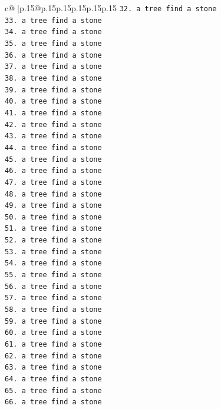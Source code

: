 \documentclass{article}
\begin{document}
{\begin{supertabular}{c@{$\;$}|p{.15\linewidth}@{}p{.15\linewidth}p{.15\linewidth}p{.15\linewidth}p{.15\linewidth}p{.15\linewidth}}
{{{\texttt{32. a tree find a stone} \\
\texttt{33. a tree find a stone} \\
\texttt{34. a tree find a stone} \\
\texttt{35. a tree find a stone} \\
\texttt{36. a tree find a stone} \\
\texttt{37. a tree find a stone} \\
\texttt{38. a tree find a stone} \\
\texttt{39. a tree find a stone} \\
\texttt{40. a tree find a stone} \\
\texttt{41. a tree find a stone} \\
\texttt{42. a tree find a stone} \\
\texttt{43. a tree find a stone} \\
\texttt{44. a tree find a stone} \\
\texttt{45. a tree find a stone} \\
\texttt{46. a tree find a stone} \\
\texttt{47. a tree find a stone} \\
\texttt{48. a tree find a stone} \\
\texttt{49. a tree find a stone} \\
\texttt{50. a tree find a stone} \\
\texttt{51. a tree find a stone} \\
\texttt{52. a tree find a stone} \\
\texttt{53. a tree find a stone} \\
\texttt{54. a tree find a stone} \\
\texttt{55. a tree find a stone} \\
\texttt{56. a tree find a stone} \\
\texttt{57. a tree find a stone} \\
\texttt{58. a tree find a stone} \\
\texttt{59. a tree find a stone} \\
\texttt{60. a tree find a stone} \\
\texttt{61. a tree find a stone} \\
\texttt{62. a tree find a stone} \\
\texttt{63. a tree find a stone} \\
\texttt{64. a tree find a stone} \\
\texttt{65. a tree find a stone} \\
\texttt{66. a tree find a stone} \\
}}}
\end{supertabular}}
\end{document}
